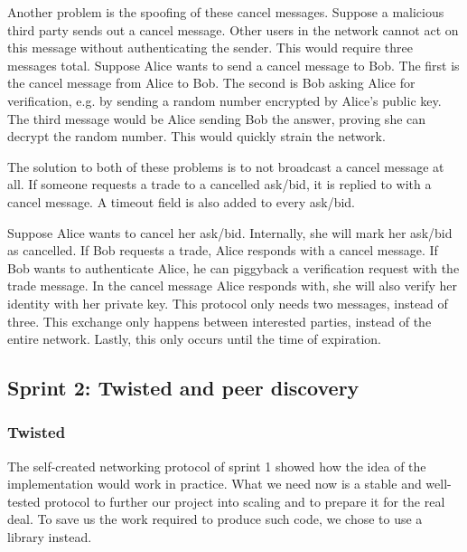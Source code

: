 \documentclass[]{article}
\begin{document}
Another problem is the spoofing of these cancel messages.
Suppose a malicious third party sends out a cancel message.
Other users in the network cannot act on this message without authenticating the sender.
This would require three messages total.
Suppose Alice wants to send a cancel message to Bob.
The first is the cancel message from Alice to Bob.
The second is Bob asking Alice for verification, e.g.
by sending a random number encrypted by Alice's public key.
The third message would be Alice sending Bob the answer, proving she can decrypt the random number.
This would quickly strain the network.


The solution to both of these problems is to not broadcast a cancel message at all.
If someone requests a trade to a cancelled ask/bid, it is replied to with a cancel message.
A timeout field is also added to every ask/bid.


Suppose Alice wants to cancel her ask/bid.
Internally, she will mark her ask/bid as cancelled.
If Bob requests a trade, Alice responds with a cancel message.
If Bob wants to authenticate Alice, he can piggyback a verification request with the trade message.
In the cancel message Alice responds with, she will also verify her identity with her private key.
This protocol only needs two messages, instead of three.
This exchange only happens between interested parties, instead of the entire network.
Lastly, this only occurs until the time of expiration.

\subsection{Sprint 2: Twisted and peer discovery}

\subsubsection{Twisted}
The self-created networking protocol of sprint 1 showed how the idea of the implementation would work in practice.
What we need now is a stable and well-tested protocol to further our project into scaling and to prepare it for the real deal.
To save us the work required to produce such code, we chose to use a library instead.
\end{document}
